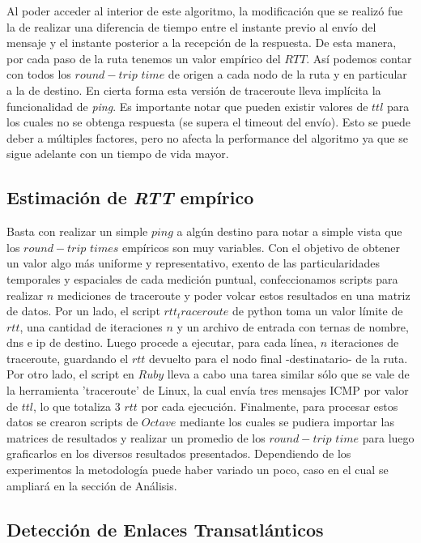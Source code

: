 \indent Al poder acceder al interior de este algoritmo, la modificación que se realizó fue la de realizar una diferencia de tiempo entre el instante previo al envío del mensaje y el instante posterior a la recepción de la respuesta. De esta manera, por cada paso de la ruta tenemos un valor empírico del $RTT$. Así podemos contar con todos los $round-trip$ $time$ de origen a cada nodo de la ruta y en particular a la de destino. En cierta forma esta versión de traceroute lleva implícita la funcionalidad de \textsl{ping}. Es importante notar que pueden existir valores de $ttl$ para los cuales no se obtenga respuesta (se supera el timeout del envío). Esto se puede deber a múltiples factores, pero no afecta la performance del algoritmo ya que se sigue adelante con un tiempo de vida mayor.\\

\subsection{Estimación de \textsl{RTT} empírico}

Basta con realizar un simple $ping$ a algún destino para notar a simple vista que los $round-trip$ $times$ empíricos son muy variables. Con el objetivo de obtener un valor algo más uniforme y representativo, exento de las particularidades temporales y espaciales de cada medición puntual, confeccionamos scripts para realizar $n$ mediciones de traceroute y poder volcar estos resultados en una matriz de datos. Por un lado, el script $rtt_traceroute$ de python toma un valor límite de $rtt$, una cantidad de iteraciones $n$ y un archivo de entrada con ternas de nombre, dns e ip de destino. Luego procede a ejecutar, para cada línea, $n$ iteraciones de traceroute, guardando el $rtt$ devuelto para el nodo final -destinatario- de la ruta. Por otro lado, el script en $Ruby$ lleva a cabo una tarea similar sólo que se vale de la herramienta 'traceroute' de Linux, la cual envía tres mensajes ICMP por valor de $ttl$, lo que totaliza 3 $rtt$ por cada ejecución. Finalmente, para procesar estos datos se crearon scripts de $Octave$ mediante los cuales se pudiera importar las matrices de resultados y realizar un promedio de los $round-trip$ $time$ para luego graficarlos en los diversos resultados presentados. Dependiendo de los experimentos la metodología puede haber variado un poco, caso en el cual se ampliará en la sección de Análisis.

\subsection{Detección de Enlaces Transatlánticos}

